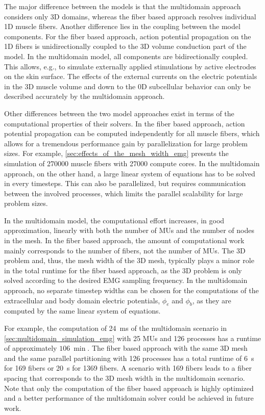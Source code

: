 The major difference between the models is that the multidomain approach considers only 3D domains, whereas the fiber based approach resolves individual 1D muscle fibers. Another difference lies in the coupling between the model components. For the fiber based approach, action potential propagation on the 1D fibers is unidirectionally coupled to the 3D volume conduction part of the model. In the multidomain model, all components are bidirectionally coupled. This allows, e.g., to simulate externally applied stimulations by active electrodes on the skin surface. The effects of the external currents on the electric potentials in the 3D muscle volume and down to the 0D subcellular behavior can only be described accurately by the multidomain approach.

Other differences between the two model approaches exist in terms of the computational properties of their solvers. In the fiber based approach, action potential propagation can be computed independently for all muscle fibers, which allows for a tremendous performance gain by parallelization for large problem sizes. For example, \cref{sec:effects_of_the_mesh_width_emg} presents the simulation of \num{270000} muscle fibers with \num{27000} compute cores.
In the multidomain approach, on the other hand, a large linear system of equations has to be solved in every timesteps. This can also be parallelized, but requires communication between the involved processes, which limits the parallel scalability for large problem sizes.

In the multidomain model, the computational effort increases, in good approximation, linearly with both the number of MUs and the number of nodes in the mesh. In the fiber based approach, the amount of computational work mainly corresponds to the number of fibers, not the number of MUs. 
The 3D problem and, thus, the mesh width of the 3D mesh, typically plays a minor role in the total runtime for the fiber based approach, as the 3D problem is only solved according to the desired EMG sampling frequency. In the multidomain approach, no separate timestep widths can be chosen for the computations of the extracellular and body domain electric potentials, $\phi_e$ and $\phi_b$, as they are computed by the same linear system of equations.

For example, the computation of \SI{24}{\ms} of the multidomain scenario in \cref{sec:multidomain_simulation_emg} with 25 MUs and 126 processes has a runtime of approximately $\SI{106}{\min}$. The fiber based approach with the same 3D mesh and the same parallel partitioning with 126 processes has a total runtime of \SI{6}{\s} for 169 fibers or \SI{20}{\s} for 1369 fibers. A scenario with 169 fibers leads to a fiber spacing that corresponds to the 3D mesh width in the multidomain scenario.
Note that only the computation of the fiber based approach is highly optimized and a better performance of the multidomain solver could be achieved in future work.


